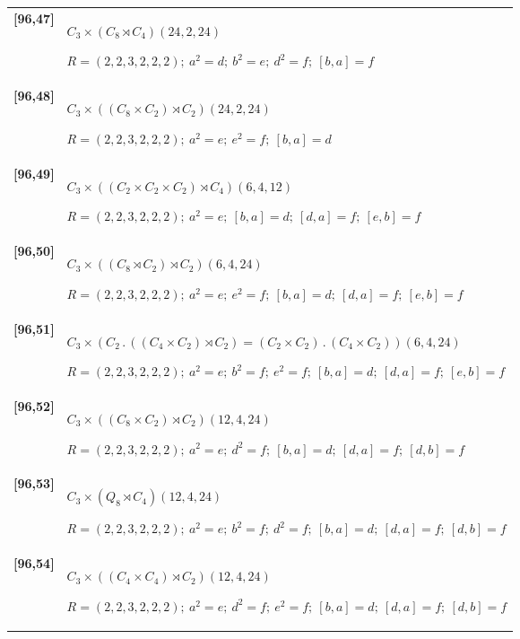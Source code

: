 \documentclass[UTF8,fontset=fandol,11pt,a4paper]{ctexart}
\begin{document}
\begin{longtable}{@{}p{17mm}>{\raggedright\arraybackslash}p{141mm}@{}}
\textbf{[96,47]} & $C_{3}\times (C_{8}\rtimes C_{4})$\quad $(24,2,24)$\par\(R=(2,2,3,2,2,2);\allowbreak\ a^{2}=d;\allowbreak\ b^{2}=e;\allowbreak\ d^{2}=f;\allowbreak\ [b,a]=f\)\\[3pt]

\textbf{[96,48]} & $C_{3}\times ((C_{8}\times C_{2})\rtimes C_{2})$\quad $(24,2,24)$\par\(R=(2,2,3,2,2,2);\allowbreak\ a^{2}=e;\allowbreak\ e^{2}=f;\allowbreak\ [b,a]=d\)\\[3pt]

\textbf{[96,49]} & $C_{3}\times ((C_{2}\times C_{2}\times C_{2})\rtimes C_{4})$\quad $(6,4,12)$\par\(R=(2,2,3,2,2,2);\allowbreak\ a^{2}=e;\allowbreak\ [b,a]=d;\allowbreak\ [d,a]=f;\allowbreak\ [e,b]=f\)\\[3pt]

\textbf{[96,50]} & $C_{3}\times ((C_{8}\rtimes C_{2})\rtimes C_{2})$\quad $(6,4,24)$\par\(R=(2,2,3,2,2,2);\allowbreak\ a^{2}=e;\allowbreak\ e^{2}=f;\allowbreak\ [b,a]=d;\allowbreak\ [d,a]=f;\allowbreak\ [e,b]=f\)\\[3pt]

\textbf{[96,51]} & $C_{3}\times (C_{2}\mathbin{.} ((C_{4}\times C_{2})\rtimes C_{2}) = (C_{2}\times C_{2})\mathbin{.} (C_{4}\times C_{2}))$\quad $(6,4,24)$\par\(R=(2,2,3,2,2,2);\allowbreak\ a^{2}=e;\allowbreak\ b^{2}=f;\allowbreak\ e^{2}=f;\allowbreak\ [b,a]=d;\allowbreak\ [d,a]=f;\allowbreak\ [e,b]=f\)\\[3pt]

\textbf{[96,52]} & $C_{3}\times ((C_{8}\times C_{2})\rtimes C_{2})$\quad $(12,4,24)$\par\(R=(2,2,3,2,2,2);\allowbreak\ a^{2}=e;\allowbreak\ d^{2}=f;\allowbreak\ [b,a]=d;\allowbreak\ [d,a]=f;\allowbreak\ [d,b]=f\)\\[3pt]

\textbf{[96,53]} & $C_{3}\times (Q_{8}\rtimes C_{4})$\quad $(12,4,24)$\par\(R=(2,2,3,2,2,2);\allowbreak\ a^{2}=e;\allowbreak\ b^{2}=f;\allowbreak\ d^{2}=f;\allowbreak\ [b,a]=d;\allowbreak\ [d,a]=f;\allowbreak\ [d,b]=f\)\\[3pt]

\textbf{[96,54]} & $C_{3}\times ((C_{4}\times C_{4})\rtimes C_{2})$\quad $(12,4,24)$\par\(R=(2,2,3,2,2,2);\allowbreak\ a^{2}=e;\allowbreak\ d^{2}=f;\allowbreak\ e^{2}=f;\allowbreak\ [b,a]=d;\allowbreak\ [d,a]=f;\allowbreak\ [d,b]=f\)\\[3pt]


\end{longtable}
\end{document}
